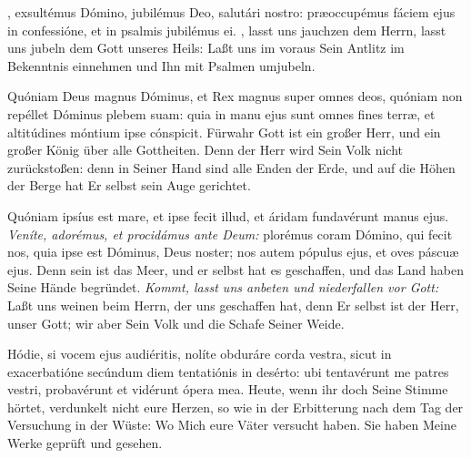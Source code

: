 \documentclass[fontsize=9pt,paper=A6,twoside,BCOR=1mm,DIV=22,headinclude]{scrarticle}
\begin{document}
\begin{paracol}{2}\pcb
{}, exsultémus Dómino, jubilémus Deo, salutári nostro: præoccupémus fáciem ejus in confessióne, et in psalmis jubilémus ei.
\switchcolumn
{}, lasst uns jauchzen dem Herrn, lasst uns jubeln dem Gott unseres Heils: Laßt uns im voraus Sein Antlitz im Bekenntnis einnehmen und Ihn mit Psalmen umjubeln.
\end{paracol}
\vspace{.5em}
\begin{paracol}{2}\pcb
	Quóniam Deus magnus Dóminus, et Rex magnus super omnes deos, quóniam non repéllet Dóminus plebem suam: quia in manu ejus sunt omnes fines terræ, et altitúdines móntium ipse cónspicit.
	\switchcolumn 
	Fürwahr Gott ist ein großer Herr, und ein großer König über alle Gottheiten. Denn der Herr wird Sein Volk nicht zurückstoßen: denn in Seiner Hand sind alle Enden der Erde, und auf die Höhen der Berge hat Er selbst sein Auge gerichtet.
\end{paracol}
\pcb
{}
\vspace{.5em}
\begin{paracol}{2}\pcb
	Quóniam ipsíus est mare, et ipse fecit illud, et áridam fundavérunt manus ejus. \textit{Veníte, adorémus, et procidámus ante Deum:} plorémus coram Dómino, qui fecit nos, quia ipse est Dóminus, Deus noster; nos autem pópulus ejus, et oves páscuæ ejus.
	\switchcolumn 
	Denn sein ist das Meer, und er selbst hat es geschaffen, und das Land haben Seine Hände begründet. \textit{Kommt, lasst uns anbeten und niederfallen vor Gott:} Laßt uns weinen beim Herrn, der uns geschaffen hat, denn Er selbst ist der Herr, unser Gott; wir aber Sein Volk und die Schafe Seiner Weide.
\end{paracol}
\vspace{.4em}
\begin{paracol}{2}\pcb
	Hódie, si vocem ejus audiéritis, nolíte obduráre corda vestra, sicut in exacerbatióne secúndum diem tentatiónis in desérto: ubi tentavérunt me patres vestri, probavérunt et vidérunt ópera mea.
	\switchcolumn 
	Heute, wenn ihr doch Seine Stimme hörtet, verdunkelt nicht eure Herzen, so wie in der Erbitterung nach dem Tag der Versuchung in der Wüste: Wo Mich eure Väter versucht haben. Sie haben Meine Werke geprüft und gesehen.
\end{paracol}
\end{document}

